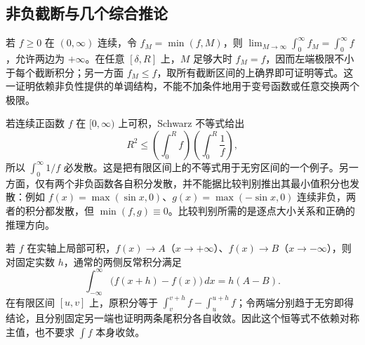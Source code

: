 \subsection{非负截断与几个综合推论}
若 $f\ge0$ 在 $(0,\infty)$ 连续，令 $f_M=\min(f,M)$，则 $\lim_{M\to\infty}\int_0^\infty f_M=\int_0^\infty f$，允许两边为 $+\infty$。在任意 $[\delta,R]$ 上，$M$ 足够大时 $f_M=f$，因而左端极限不小于每个截断积分；另一方面 $f_M\le f$，取所有截断区间的上确界即可证明等式。这一证明依赖非负性提供的单调结构，不能不加条件地用于变号函数或任意交换两个极限。

若连续正函数 $f$ 在 $[0,\infty)$ 上可积，Schwarz 不等式给出
\[
 R^2\le\left(\int_0^Rf\right)\left(\int_0^R\frac1f\right),
\]
所以 $\int_0^\infty1/f$ 必发散。这是把有限区间上的不等式用于无穷区间的一个例子。另一方面，仅有两个非负函数各自积分发散，并不能据比较判别推出其最小值积分也发散：例如 $f(x)=\max(\sin x,0)$、$g(x)=\max(-\sin x,0)$ 连续非负，两者的积分都发散，但 $\min(f,g)\equiv0$。比较判别所需的是逐点大小关系和正确的推理方向。

若 $f$ 在实轴上局部可积，$f(x)\to A$（$x\to+\infty$）、$f(x)\to B$（$x\to-\infty$），则对固定实数 $h$，通常的两侧反常积分满足
\[
 \int_{-\infty}^\infty\bigl(f(x+h)-f(x)\bigr)\,dx=h(A-B).
\]
在有限区间 $[u,v]$ 上，原积分等于 $\int_v^{v+h}f-\int_u^{u+h}f$；令两端分别趋于无穷即得结论，且分别固定另一端也证明两条尾积分各自收敛。因此这个恒等式不依赖对称主值，也不要求 $\int f$ 本身收敛。





